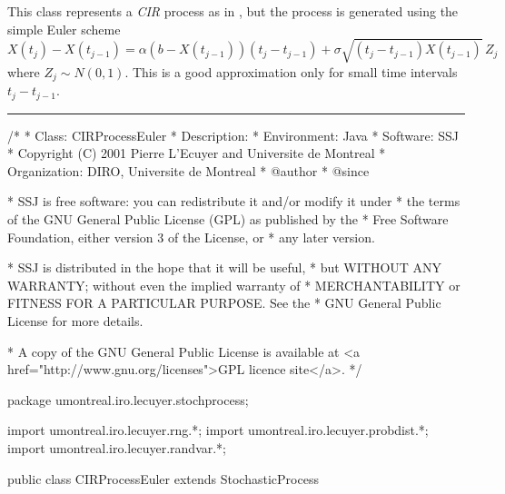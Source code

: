 
This class represents a \emph{CIR} process
as in , but
the process is generated using the simple Euler scheme
\begin{equation}
   X(t_j) - X(t_{j-1}) = \alpha(b - X(t_{j-1}))(t_j - t_{j-1}) +
      \sigma \sqrt{(t_j - t_{j-1})X(t_{j-1})}\, Z_j
                                    \label{eq:cir-seq-euler}
\end{equation}
where $Z_j \sim N(0,1)$. This is a good approximation only for small
time intervals $t_j - t_{j-1}$.

\bigskip\hrule\bigskip

\begin{code}
\begin{hide}
/*
 * Class:        CIRProcessEuler
 * Description:  
 * Environment:  Java
 * Software:     SSJ 
 * Copyright (C) 2001  Pierre L'Ecuyer and Universite de Montreal
 * Organization: DIRO, Universite de Montreal
 * @author       
 * @since

 * SSJ is free software: you can redistribute it and/or modify it under
 * the terms of the GNU General Public License (GPL) as published by the
 * Free Software Foundation, either version 3 of the License, or
 * any later version.

 * SSJ is distributed in the hope that it will be useful,
 * but WITHOUT ANY WARRANTY; without even the implied warranty of
 * MERCHANTABILITY or FITNESS FOR A PARTICULAR PURPOSE.  See the
 * GNU General Public License for more details.

 * A copy of the GNU General Public License is available at
   <a href="http://www.gnu.org/licenses">GPL licence site</a>.
 */
\end{hide}
package umontreal.iro.lecuyer.stochprocess;\begin{hide}
import umontreal.iro.lecuyer.rng.*;
import umontreal.iro.lecuyer.probdist.*;
import umontreal.iro.lecuyer.randvar.*;

\end{hide}

public class CIRProcessEuler extends StochasticProcess \begin{hide} {
    protected NormalGen    gen;
    protected double       alpha,
                           beta,
                           sigma;
    // Precomputed values
    protected double[]     alphadt,
                           sigmasqrdt;
\end{hide}
\end{code}

